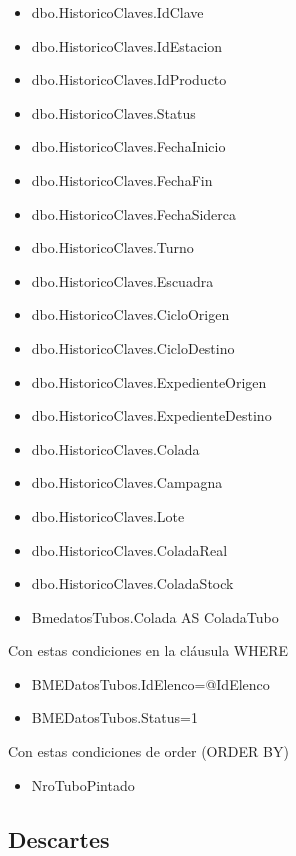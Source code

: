 \documentclass[]{article}
\begin{document}
\begin{itemize}[label=\textcolor{blue}{\textbullet}]
	\item dbo.HistoricoClaves.IdClave
	\item dbo.HistoricoClaves.IdEstacion
	\item dbo.HistoricoClaves.IdProducto
	\item dbo.HistoricoClaves.Status
	\item dbo.HistoricoClaves.FechaInicio
	\item dbo.HistoricoClaves.FechaFin
	\item dbo.HistoricoClaves.FechaSiderca
	\item dbo.HistoricoClaves.Turno
	\item dbo.HistoricoClaves.Escuadra
	\item dbo.HistoricoClaves.CicloOrigen
	\item dbo.HistoricoClaves.CicloDestino
	\item dbo.HistoricoClaves.ExpedienteOrigen
	\item dbo.HistoricoClaves.ExpedienteDestino
	\item dbo.HistoricoClaves.Colada
	\item dbo.HistoricoClaves.Campagna
	\item dbo.HistoricoClaves.Lote
	\item dbo.HistoricoClaves.ColadaReal
	\item dbo.HistoricoClaves.ColadaStock  
	\item BmedatosTubos.Colada AS ColadaTubo 
\end{itemize}

\par Con estas condiciones en la cláusula WHERE

\begin{itemize}[label=\textcolor{blue}{\textbullet}]
	\item BMEDatosTubos.IdElenco=@IdElenco 
	\item BMEDatosTubos.Status=1 
\end{itemize}

\par Con estas condiciones de order (ORDER BY)

\begin{itemize}[label=\textcolor{blue}{\textbullet}]
	\item NroTuboPintado	
\end{itemize}

\newpage

\subsection{Descartes}
\end{document}
